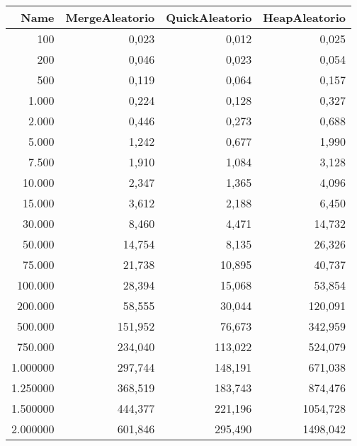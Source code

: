 \begin{tabular}{rrrr}
\toprule
Name & MergeAleatorio & QuickAleatorio & HeapAleatorio \\
\midrule
100 & 0,023 & 0,012 & 0,025 \\
200 & 0,046 & 0,023 & 0,054 \\
500 & 0,119 & 0,064 & 0,157 \\
1.000 & 0,224 & 0,128 & 0,327 \\
2.000 & 0,446 & 0,273 & 0,688 \\
5.000 & 1,242 & 0,677 & 1,990 \\
7.500 & 1,910 & 1,084 & 3,128 \\
10.000 & 2,347 & 1,365 & 4,096 \\
15.000 & 3,612 & 2,188 & 6,450 \\
30.000 & 8,460 & 4,471 & 14,732 \\
50.000 & 14,754 & 8,135 & 26,326 \\
75.000 & 21,738 & 10,895 & 40,737 \\
100.000 & 28,394 & 15,068 & 53,854 \\
200.000 & 58,555 & 30,044 & 120,091 \\
500.000 & 151,952 & 76,673 & 342,959 \\
750.000 & 234,040 & 113,022 & 524,079 \\
1.000000 & 297,744 & 148,191 & 671,038 \\
1.250000 & 368,519 & 183,743 & 874,476 \\
1.500000 & 444,377 & 221,196 & 1054,728 \\
2.000000 & 601,846 & 295,490 & 1498,042 \\
\bottomrule
\end{tabular}
